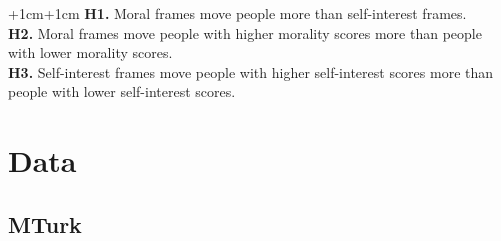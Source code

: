 \documentclass[12pt,econ]{sources/authesis}
\begin{document}
\vspace{0.3cm}
\begin{adjustwidth*}{+1cm}{+1cm}
\noindent \textbf{H1.} Moral frames move people more than self-interest frames.\\
\noindent \textbf{H2.} Moral frames move people with higher morality scores more than people with lower morality scores.\\
\noindent \textbf{H3.} Self-interest frames move people with higher self-interest scores more than people with lower self-interest scores.\\
\end{adjustwidth*}
\hypertarget{framing-data}{%
\section{Data}\label{framing-data}}

\hypertarget{framing-data-mturk}{%
\subsection{MTurk}\label{framing-data-mturk}}
\end{document}
